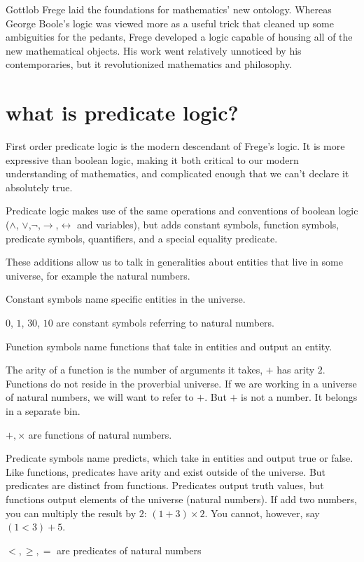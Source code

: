 \message{ !name(truth.tex)}\documentclass{scrbook}
\renewcommand{\implies}{\to}
\renewcommand{\iff}{\leftrightarrow}
\begin{document}
Gottlob Frege laid the foundations for mathematics' new ontology. Whereas George Boole's logic was viewed more as a useful trick that cleaned up some ambiguities for the pedants, Frege developed a logic capable of housing all of the new mathematical objects. His work went relatively unnoticed by his contemporaries, but it revolutionized mathematics and philosophy. 

\section[What is Predicate Logic?]{what is predicate logic?}\label{ch:pred}
First order predicate logic is the modern descendant of Frege's logic. It is more expressive than boolean logic, making it both critical to our modern understanding of mathematics, and complicated enough that we can't declare it absolutely true. 

Predicate logic makes use of the same operations and conventions of boolean logic ($\wedge$, $\vee$,$\neg$,$\implies$,$\iff$ and variables), but adds constant symbols, function symbols,  predicate symbols, quantifiers, and a special equality predicate. 

These additions allow us to talk in generalities about entities that live in some universe, for example the natural numbers. 

\begin{defn}
  Constant symbols name specific entities in the universe.
\begin{example}
  $0$, $1$, $30$, $10$ are constant symbols referring to natural numbers. 
\end{example}
\end{defn}

\begin{defn}
  Function symbols name functions that take in entities and output an
  entity.

  The arity of a function is the number of arguments it takes, \eg $+$ has arity $2$.
Functions do not reside in the proverbial universe. If we are working in a universe of natural numbers, we will want to refer to $+$. But $+$ is not a number. It belongs in a separate bin.
\end{defn}
\begin{example}
  $+,\times$ are functions of natural numbers. 
\end{example}
\begin{defn}
  Predicate symbols name predicts, which take in entities and output true or false.
Like functions, predicates have arity and exist outside of the universe. But predicates are distinct from functions. Predicates output truth values, but functions output elements of the universe (\eg natural numbers). If add two numbers, you can multiply the result by $2$: $(1+3)\times 2$. You cannot, however, say $(1<3)+5$. 
\end{defn}
\begin{example}
  $<,\geq,=$ are predicates of natural numbers
\end{example}
\end{document}

